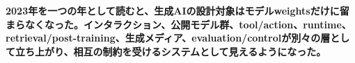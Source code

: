 \noindent\textbf{2023年を一つの年として読むと、生成AIの設計対象はモデルweightsだけに留まらなくなった。インタラクション、公開モデル群、tool/action、runtime、retrieval/post-training、生成メディア、evaluation/controlが別々の層として立ち上がり、相互の制約を受けるシステムとして見えるようになった。}
